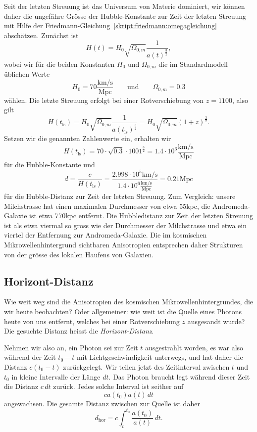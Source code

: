 Seit der letzten Streuung ist das Universum von Materie dominiert,
wir können daher die ungefähre Grösse der Hubble-Konstante zur
Zeit der letzten Streuung mit Hilfe der
Friedmann-Gleichung~\eqref{skript:friedmann:omegagleichung}
abschätzen.
Zunächst ist
\[
H(t) = H_0\sqrt{\Omega_{0,m}}\frac{1}{a(t)^\frac32},
\]
wobei wir für die beiden Konstanten $H_0$ und $\Omega_{0,m}$ die
im Standardmodell üblichen Werte
\[
H_0
=
70 \frac{\text{km/s}}{\text{Mpc}}
\qquad\text{und}\qquad
\Omega_{0,m}=0.3
\]
wählen.
Die letzte Streuung erfolgt bei einer Rotverschiebung von $z=1100$, also
gilt
\[
H(t_{\text{ls}})
=
H_0\sqrt{\Omega_{0,m}}\frac{1}{a(t_{\text{ls}})^\frac32}
=
H_0\sqrt{\Omega_{0,m}}(1+z)^\frac32.
\]
Setzen wir die genannten Zahlenwerte ein, erhalten wir
\[
H(t_{\text{ls}})
=
70\cdot \sqrt{0.3}\cdot 1001^\frac32
=
1.4\cdot 10^{6}\frac{\text{km/s}}{\text{Mpc}}
\]
für die Hubble-Konstante und 
\[
d
=
\frac{c}{H(t_{\text{ls}})}
=
\frac{2.998\cdot 10^{5}\text{km/s}}%
{1.4\cdot 10^{6}\frac{\text{km/s}}{\text{Mpc}}}
=
0.21\text{Mpc}
\]
für die Hubble-Distanz zur Zeit der letzten Streuung.
Zum Vergleich: unsere Milchstrasse hat einen maximalen Durchmesser
von etwa 55kpc, die Andromeda-Galaxie ist etwa 770kpc entfernt.
Die Hubbledistanz zur Zeit der letzten Streuung ist als etwa viermal
so gross wie der Durchmesser der Milchstrasse und etwa ein viertel der
Entfernung zur Andromeda-Galaxie.
Die im kosmischen Mikrowellenhintergrund sichtbaren Anisotropien
entsprechen daher Strukturen von der grösse des lokalen Haufens von
Galaxien.

\subsection{Horizont-Distanz}
Wie weit weg sind die Anisotropien des kosmischen Mikrowellenhintergrundes,
die wir heute beobachten?
Oder allgemeiner: wie weit ist die Quelle eines Photons heute von uns
entfernt, welches bei einer Rotverschiebung $z$ ausgesandt wurde?
Die gesuchte Distanz heisst die {\em Horizont-Distanz}.

Nehmen wir also an, ein Photon sei zur Zeit $t$ ausgestrahlt worden,
es war also während der Zeit $t_0-t$ mit Lichtgeschwindigkeit unterwegs,
und hat daher die Distanz $c(t_0-t)$ zurückgelegt.
Wir teilen jetzt des Zeitinterval zwischen $t$ und $t_0$ in kleine
Intervalle der Länge $dt$.
Das Photon braucht legt während dieser Zeit die Distanz $c\,dt$
zurück.
Jedes solche Interval ist seither auf
\[
c {a(t_0)}{a(t)}\,dt
\]
angewachsen.
Die gesamte Distanz zwischen zur Quelle ist daher
\[
d_\text{hor} = c \int_t^{t_0} \frac{a(t_0)}{a(t)}\,dt.
\]

